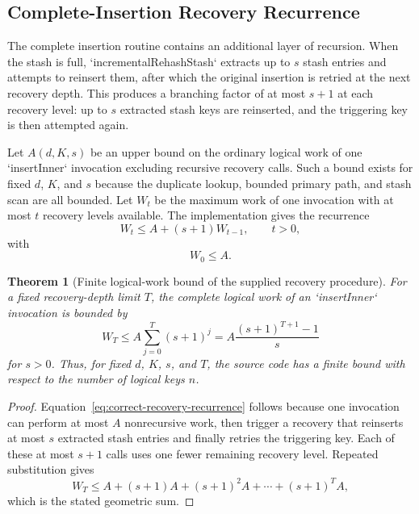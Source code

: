 \documentclass[conference]{IEEEtran}
\newtheorem{theorem}{Theorem}
\begin{document}
\subsection{Complete-Insertion Recovery Recurrence}

The complete insertion routine contains an additional layer of recursion. When the stash is full, `incrementalRehashStash` extracts up to $s$ stash entries and attempts to reinsert them, after which the original insertion is retried at the next recovery depth. This produces a branching factor of at most $s+1$ at each recovery level: up to $s$ extracted stash keys are reinserted, and the triggering key is then attempted again.

Let $A(d,K,s)$ be an upper bound on the ordinary logical work of one `insertInner` invocation excluding recursive recovery calls. Such a bound exists for fixed $d$, $K$, and $s$ because the duplicate lookup, bounded primary path, and stash scan are all bounded. Let $W_t$ be the maximum work of one invocation with at most $t$ recovery levels available. The implementation gives the recurrence
\begin{equation}
    W_t \le A + (s+1)W_{t-1},
    \qquad t>0,
    \label{eq:correct-recovery-recurrence}
\end{equation}
with
\begin{equation}
    W_0\le A.
    \label{eq:recovery-base}
\end{equation}

\begin{theorem}[Finite logical-work bound of the supplied recovery procedure]
For a fixed recovery-depth limit $T$, the complete logical work of an `insertInner` invocation is bounded by
\begin{equation}
    W_T
    \le A\sum_{j=0}^{T}(s+1)^j
    =A\frac{(s+1)^{T+1}-1}{s}
\end{equation}
for $s>0$. Thus, for fixed $d$, $K$, $s$, and $T$, the source code has a finite bound with respect to the number of logical keys $n$.
\end{theorem}

\begin{proof}
Equation~\eqref{eq:correct-recovery-recurrence} follows because one invocation can perform at most $A$ nonrecursive work, then trigger a recovery that reinserts at most $s$ extracted stash entries and finally retries the triggering key. Each of these at most $s+1$ calls uses one fewer remaining recovery level. Repeated substitution gives
\[
W_T\le A+(s+1)A+(s+1)^2A+\cdots+(s+1)^T A,
\]
which is the stated geometric sum.
\end{proof}
\end{document}
